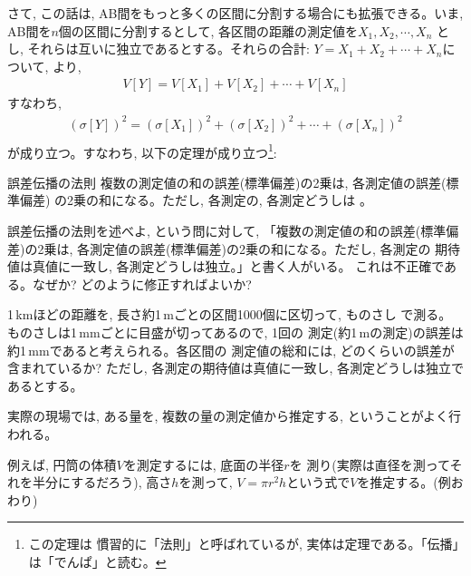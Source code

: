 さて, この話は, AB間をもっと多くの区間に分割する場合にも拡張できる。いま, 
AB間を$n$個の区間に分割するとして, 各区間の距離の測定値を$X_1, X_2, \cdots, X_n$
とし, それらは互いに独立であるとする。それらの合計: $Y=X_1+X_2+\cdots+X_n$について, 
より, 
\begin{eqnarray}V[Y]=V[X_1]+V[X_2]+\cdots+V[X_n]\end{eqnarray}
すなわち, 
\begin{eqnarray}
(\sigma[Y])^2=(\sigma[X_1])^2+(\sigma [X_2])^2+\cdots+(\sigma [X_n])^2\nonumber\\
\label{eq:gosadempa00}
\end{eqnarray}
が成り立つ。すなわち, 以下の定理が成り立つ\footnote{この定理は
慣習的に「法則」と呼ばれているが, 実体は定理である。「伝播」は「でんぱ」と読む。}:
\begin{itembox}{誤差伝播の法則}
複数の測定値の和の誤差(標準偏差)の2乗は, 各測定値の誤差(標準偏差)
の2乗の和になる。ただし, 各測定の, 各測定どうしは
。
\end{itembox}
\mv

\begin{q}\label{q:gosadenpa_insuffice} 誤差伝播の法則を述べよ, 
という問に対して, 「複数の測定値の和の誤差(標準偏差)の2乗は, 
各測定値の誤差(標準偏差)の2乗の和になる。ただし, 各測定の
期待値は真値に一致し, 各測定どうしは独立。」と書く人がいる。
これは不正確である。なぜか? どのように修正すればよいか?
\end{q}
\vv

\begin{q}\label{q:error_prop_1m_1km} 
1$\,$kmほどの距離を, 長さ約1$\,$mごとの区間1000個に区切って, ものさし
で測る。ものさしは1$\,$mmごとに目盛が切ってあるので, 1回の
測定(約1$\,$mの測定)の誤差は約1$\,$mmであると考えられる。各区間の
測定値の総和には, どのくらいの誤差が含まれているか?
ただし, 各測定の期待値は真値に一致し, 各測定どうしは独立であるとする。
\end{q}
\vv

実際の現場では, ある量を, 複数の量の測定値から推定する, ということがよく行われる。

\begin{exmpl}\label{exmpl:entoh_Vrh} 例えば, 円筒の体積$V$を測定するには, 底面の半径$r$を
測り(実際は直径を測ってそれを半分にするだろう), 高さ$h$を測って, 
$V=\pi r^2 h$という式で$V$を推定する。(例おわり)\end{exmpl}

